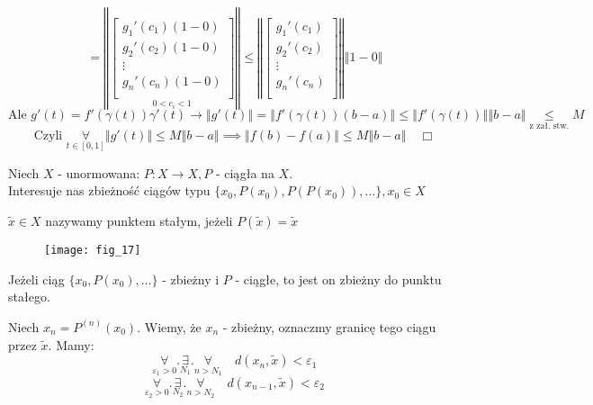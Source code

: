 \documentclass[../main.tex]{subfiles}
\begin{document}
$$=\left\Vert \underset{0<c_i<1}{\left [ \begin{matrix}
g_1'(c_1)(1-0)\\
g_2'(c_2)(1-0)\\
\vdots\\
    g_n'(c_n)(1-0)\\ \end{matrix}\right ]}\right\Vert \leq \left\Vert \left [ \begin{matrix}
g_1'(c_1)\\
g_2'(c_2)\\
\vdots\\
g_n'(c_n)\\ \end{matrix}\right ] \right\Vert \left\Vert 1 - 0 \right\Vert$$
$$\text{Ale } g'(t) = f'(\gamma(t))\gamma'(t) \to \left\Vert g'(t)\right\Vert = \left\Vert f'(\gamma(t))(b-a)\right\Vert \leq \left\Vert f'(\gamma(t))\right\Vert \left\Vert b-a \right\Vert \underset{\text{z zał. stw.}}{\leq} M$$
$$\text{Czyli }\underset{t\in[0,1]}{\forall}\left\Vert g'(t) \right\Vert \leq M\left\Vert b-a \right\Vert \implies \left\Vert f(b) - f(a) \right\Vert \leq M \left\Vert b - a \right\Vert \quad \Box$$

Niech $X$ - unormowana: $P: X\to X, P$ - ciągła na $X$.\\
Interesuje nas zbieżność ciągów typu $\{x_0, P(x_0), P(P(x_0)),\dots \}, x_0\in X$

\begin{definicja}
    $\tilde x \in X$ nazywamy punktem stałym, jeżeli $P(\tilde x) = \tilde x$
\end{definicja}

\begin{figure}[h]
    \centering
    \texttt{[image: fig\_17]}
\end{figure}

\begin{tw}
Jeżeli ciąg $\{x_0, P(x_0), \dots \} $ - zbieżny i $P$ - ciągłe, to jest on zbieżny do punktu stałego.
\end{tw}

\begin{dowod}

\end{dowod}
Niech $x_n = P^{(n)} (x_0)$. Wiemy, że $x_n$ - zbieżny, oznaczmy granicę tego ciągu przez $\tilde x$.
Mamy:
\begin{equation}\label{eq:d2}
    \underset{\varepsilon_1 > 0}{\forall}.\underset{N_1}{\exists}.\underset{n>N_1}{\forall}\quad d(x_n,\tilde x) < \varepsilon_1
\end{equation}
\begin{equation}\label{eq:d3}
    \underset{\varepsilon_2>0}{\forall}.\underset{N_2}{\exists}.\underset{n>N_2}{\forall}\quad d(x_{n-1},\tilde x) < \varepsilon_2
\end{equation}
\end{document}
